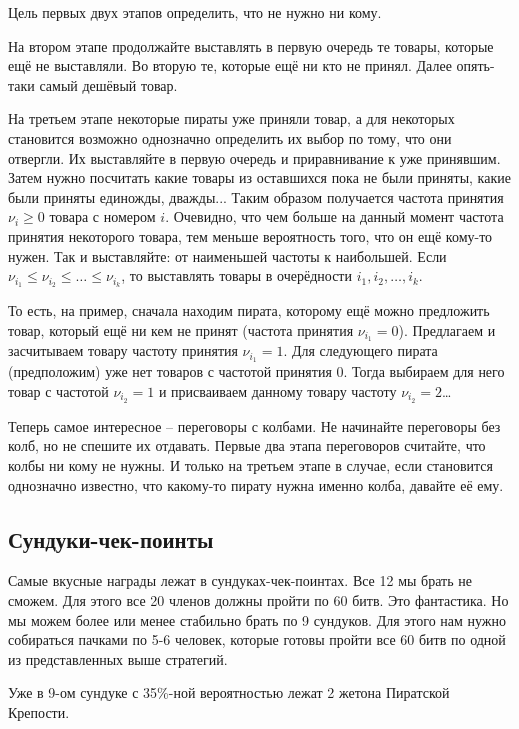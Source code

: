 Цель первых двух этапов определить, что не нужно ни кому.

На втором этапе продолжайте выставлять в первую очередь те товары, которые ещё не выставляли. 
Во вторую те, которые ещё ни кто не принял. 
Далее опять-таки самый дешёвый товар.

На третьем этапе некоторые пираты уже приняли товар, а для некоторых становится возможно однозначно определить их выбор по тому, что они отвергли. 
Их выставляйте в первую очередь и приравнивание к уже принявшим. 
Затем нужно посчитать какие товары из оставшихся пока не были приняты, какие были приняты единожды, дважды... 
Таким образом получается частота принятия $\nu_i \geqslant 0$ товара с номером $i$.
Очевидно, что чем больше на данный момент частота принятия некоторого товара, тем меньше вероятность того, что он ещё кому-то нужен. 
Так и выставляйте: от наименьшей частоты  к наибольшей.
Если $\nu_{i_1} \leqslant \nu_{i_2} \leqslant \ldots \leqslant \nu_{i_k}$, то выставлять товары в очерёдности $i_1, i_2, \ldots, i_k$. 

То есть, на пример, сначала находим пирата, которому ещё можно предложить товар, который ещё ни кем не принят (частота принятия $\nu_{i_1} = 0$). Предлагаем и засчитываем товару частоту принятия $\nu_{i_1} = 1$. Для следующего пирата (предположим) уже нет товаров с частотой принятия 0. Тогда выбираем для него товар с частотой $\nu_{i_2} = 1$ и присваиваем данному товару частоту $\nu_{i_2} = 2$\ldots

Теперь самое интересное -- переговоры с колбами. 
Не начинайте переговоры без колб, но не спешите их отдавать. 
Первые два этапа переговоров считайте, что колбы ни кому не нужны. 
И только на третьем этапе в случае, если становится однозначно известно, что какому-то пирату нужна именно колба, давайте её ему.

\subsection{Сундуки-чек-поинты}

Самые вкусные награды лежат в сундуках-чек-поинтах. Все 12 мы брать не сможем. 
Для этого все 20 членов должны пройти по 60 битв. Это фантастика. 
Но мы можем более или менее стабильно брать по 9 сундуков. 
Для этого нам нужно собираться пачками по 5-6 человек, которые готовы пройти все 60 битв по одной из представленных выше стратегий.

Уже в 9-ом сундуке с 35\%-ной вероятностью лежат 2 жетона Пиратской Крепости.
